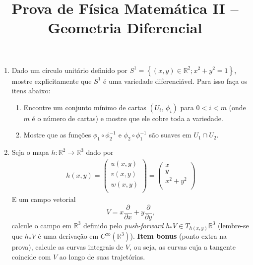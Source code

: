 \newif\ifuseseminar
\useseminartrue


\title{Prova de Física Matemática II -- Geometria Diferencial}



\begin{enumerate}
	\item Dado um círculo unitário definido por $S^1=\left\{(x,y)\in \mathbb{R}^2;
		      x^2+y^2=1\right\}$, mostre explicitamente que $S^1$ é uma variedade
	      diferenciável. Para isso faça os itens abaixo:
	      \begin{enumerate}
		      \item Encontre um conjunto mínimo de cartas $(U_i,\,\phi_i)$ para $0<i<m$
		            (onde $m$ é o número de cartas) e mostre que ele cobre toda a variedade.
		      \item Mostre que as funções $\phi_1\circ\phi_2^{-1}$ e
		            $\phi_2\circ\phi_1^{-1}$ são suaves em $U_1 \cap U_2$.
	      \end{enumerate}

	\item Seja o mapa $h:\mathbb{R}^2\rightarrow\mathbb{R}^3$ dado por
	      \begin{align}
		      h(x,y) = \left(\begin{matrix}
			                     u(x,y) \\
			                     v(x,y) \\
			                     w(x,y) \\
		                     \end{matrix}\right)
		      =\left(\begin{matrix}
			             x       \\
			             y       \\
			             x^2+y^2 \\
		             \end{matrix}\right)
	      \end{align}
	      E um campo vetorial $$V=x\frac{\partial}{\partial x}+y\frac{\partial}{\partial
			      y},$$ calcule o campo em $\mathbb{R}^3$ definido pelo
	      \emph{push-forward} $h_* V\in T_{h(x,y)}\mathbb{R}^3$ (lembre-se que
	      $h_* V$ é uma derivação em $C^\infty\left(\mathbb{R}^3\right)$).
	      \textbf{Item bonus} (ponto extra na prova), calcule as curvas
	      integrais de $V$, ou seja, as curvas cuja a tangente coincide com $V$
	      ao longo de suas trajetórias.


\end{enumerate}
